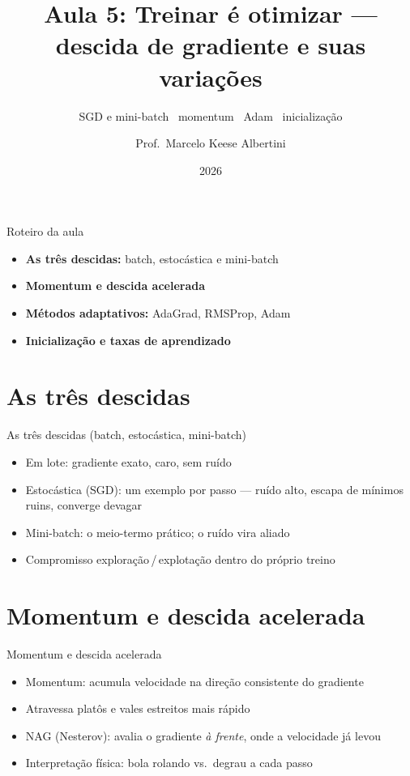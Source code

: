 \documentclass[aspectratio=169, 11pt]{beamer}
\title[Aula 5 — Otimização]{Aula 5: Treinar é otimizar — descida de gradiente e suas variações}
\subtitle[GBC073 — Inteligência Computacional]{SGD e mini-batch \textbullet\ momentum \textbullet\ Adam \textbullet\ inicialização}
\author[Prof.\ Marcelo Albertini]{Prof.\ Marcelo Keese Albertini}
\institute{GBC073 — Inteligência Computacional \textbullet\ Universidade Federal de Uberlândia}
\date{2026}
\begin{document}
\begin{frame}
  \titlepage
\end{frame}

\begin{frame}{Roteiro da aula}
  \begin{itemize}\setlength{\itemsep}{0.5ex}
    \item<1-> \textbf{As três descidas:} batch, estocástica e mini-batch
    \item<2-> \textbf{Momentum e descida acelerada}
    \item<3-> \textbf{Métodos adaptativos:} AdaGrad, RMSProp, Adam
    \item<4-> \textbf{Inicialização e taxas de aprendizado}
  \end{itemize}
\end{frame}

\section{As três descidas}

\begin{frame}{As três descidas (batch, estocástica, mini-batch)}
  \begin{itemize}\setlength{\itemsep}{0.4ex}
    \item Em lote: gradiente exato, caro, sem ruído
    \item Estocástica (SGD): um exemplo por passo — ruído alto, escapa de
          mínimos ruins, converge devagar
    \item Mini-batch: o meio-termo prático; o ruído vira aliado
    \item Compromisso exploração\,/\,explotação dentro do próprio treino
  \end{itemize}
\end{frame}

\section{Momentum e descida acelerada}

\begin{frame}{Momentum e descida acelerada}
  \begin{itemize}\setlength{\itemsep}{0.4ex}
    \item Momentum: acumula velocidade na direção consistente do gradiente
    \item Atravessa platôs e vales estreitos mais rápido
    \item NAG (Nesterov): avalia o gradiente \emph{à frente}, onde a
          velocidade já levou
    \item Interpretação física: bola rolando vs.\ degrau a cada passo
  \end{itemize}
\end{frame}
\end{document}

